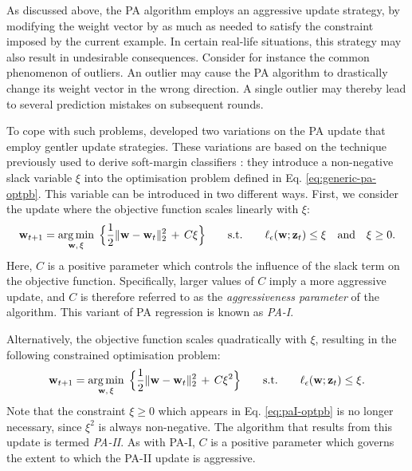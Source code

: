 As discussed above, the PA algorithm employs an aggressive update strategy, by modifying the weight vector by as much as needed to satisfy the constraint imposed by the current example. In certain real-life situations, this strategy may also result in undesirable consequences. Consider for instance the common phenomenon of outliers. An outlier may cause the PA algorithm to drastically change its weight vector in the wrong direction. A single outlier may thereby lead to several prediction mistakes on subsequent rounds.

To cope with such problems, \citet{crammer06} developed two variations on the PA update that employ gentler update strategies. These variations are based on the technique previously used to derive soft-margin classifiers \citep{vapnik98}: they introduce a non-negative slack variable $\xi$ into the optimisation problem defined in Eq. \eqref{eq:generic-pa-optpb}. This variable can be introduced in two different ways. First, we consider the update where the objective function scales linearly with $\xi$:
\begin{equation}
\label{eq:paI-optpb}
	\mathbf{w}_{t+1} = \operatorname*{arg\,min}_{\mathbf{w},\, \xi} \; \Big\{\frac{1}{2}\Vert\mathbf{w} - \mathbf{w}_t\Vert_2^2 \, + \, C\xi\Big\}
	\qquad \text{s.t.} \qquad \ell_{\epsilon}(\mathbf{w}; \mathbf{z}_t) \leq \xi \quad \text{and} \quad \xi \geq 0.
\end{equation}
Here, $C$ is a positive parameter which controls the influence of the slack term on the objective function. Specifically, larger values of $C$ imply a more aggressive update, and $C$ is therefore referred to as the \emph{aggressiveness parameter} of the algorithm. This variant of PA regression is known as \emph{PA-I}.

Alternatively, the objective function scales quadratically with $\xi$, resulting in the following constrained optimisation problem:
\begin{equation}
\label{eq:paII-optpb}
	\mathbf{w}_{t+1} = \operatorname*{arg\,min}_{\mathbf{w},\, \xi} \; \Big\{\frac{1}{2}\Vert\mathbf{w} - \mathbf{w}_t\Vert_2^2 \, + \, C\xi^2\Big\}
	\qquad \text{s.t.} \qquad \ell_{\epsilon}(\mathbf{w}; \mathbf{z}_t) \leq \xi.
\end{equation}
Note that the constraint $\xi \geq 0$ which appears in Eq. \eqref{eq:paI-optpb} is no longer necessary, since $\xi^2$ is always non-negative. The algorithm that results from this update is termed \emph{PA-II}. As with PA-I, $C$ is a positive
parameter which governs the extent to which the PA-II update is aggressive.

